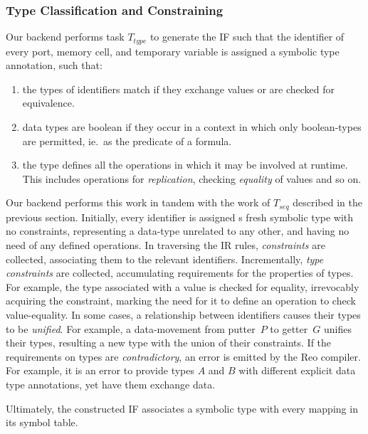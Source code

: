 \subsubsection{Type Classification and Constraining}
Our backend performs task $T_{type}$ to generate the IF such that the identifier of every port, memory cell, and temporary variable is assigned a symbolic type annotation, such that:
\begin{enumerate}
	\item the types of identifiers match if they exchange values or are checked for equivalence.
	\item data types are boolean if they occur in a context in which only boolean-types are permitted, ie.\ as the predicate of a formula.
	\item the type defines all the operations in which it may be involved at runtime. This includes operations for \textit{replication}, checking \textit{equality} of values and so on.
\end{enumerate}

Our backend performs this work in tandem with the work of $T_{seq}$ described in the previous section. Initially, every identifier is assigned s fresh symbolic type with no constraints, representing a data-type unrelated to any other, and having no need of any defined operations. In traversing the IR rules, \textit{constraints} are collected, associating them to the relevant identifiers. Incrementally, \textit{type constraints} are collected, accumulating requirements for the properties of types. For example, the type associated with a value is checked for equality, irrevocably acquiring the  constraint, marking the need for it to define an operation to check value-equality. In some cases, a relationship between identifiers causes their types to be \textit{unified}. For example, a data-movement from putter~$P$ to getter~$G$ unifies their types, resulting a new type with the union of their constraints. If the requirements on types are \textit{contradictory}, an error is emitted by the Reo compiler. For example, it is an error to provide types $A$ and $B$ with different explicit data type annotations, yet have them exchange data.

Ultimately, the constructed IF associates a symbolic type with every mapping in its symbol table.

